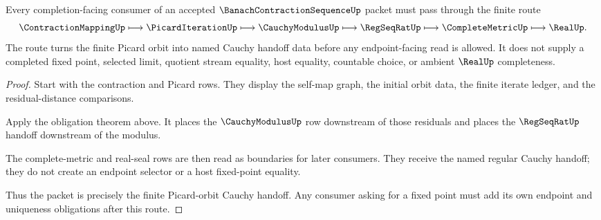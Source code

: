 \begin{theorem}
\label{thm:banach-contraction-sequence-picard-cauchy-handoff}
Every completion-facing consumer of an accepted $\BanachContractionSequenceUp$ packet must pass through the finite route
$$
\ContractionMappingUp \longmapsto \PicardIterationUp \longmapsto \CauchyModulusUp \longmapsto \RegSeqRatUp \longmapsto \CompleteMetricUp \longmapsto \RealUp .
$$
The route turns the finite Picard orbit into named Cauchy handoff data before any endpoint-facing read is allowed. It does not supply a completed fixed point, selected limit, quotient stream equality, host equality, countable choice, or ambient $\RealUp$ completeness.
\end{theorem}
\begin{proof}
Start with the contraction and Picard rows. They display the self-map graph, the initial orbit data, the finite iterate ledger, and the residual-distance comparisons.

Apply the obligation theorem above. It places the $\CauchyModulusUp$ row downstream of those residuals and places the $\RegSeqRatUp$ handoff downstream of the modulus.

The complete-metric and real-seal rows are then read as boundaries for later consumers. They receive the named regular Cauchy handoff; they do not create an endpoint selector or a host fixed-point equality.

Thus the packet is precisely the finite Picard-orbit Cauchy handoff. Any consumer asking for a fixed point must add its own endpoint and uniqueness obligations after this route.
\end{proof}





